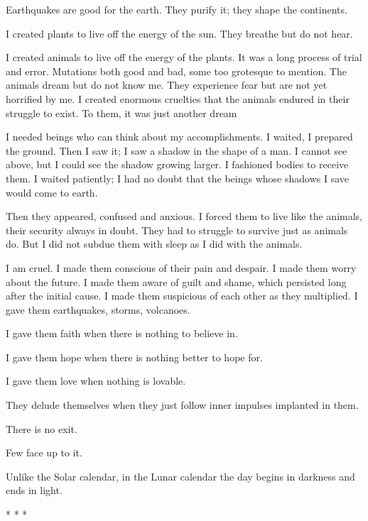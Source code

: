 Earthquakes are good for the earth. They purify it; they shape the continents.

I created plants to live off the energy of the sun. They breathe but do not hear.

I created animals to live off the energy of the plants. It was a long process of trial and error. Mutations both good and bad, some too grotesque to mention. The animals dream but do not know me. They experience fear but are not yet horrified by me. I created enormous cruelties that the animals endured in their struggle to exist. To them, it was just another dream

I needed beings who can think about my accomplishments. I waited, I prepared the ground. Then I saw it; I saw a shadow in the shape of a man. I cannot see above, but I could see the shadow growing larger. I fashioned bodies to receive them. I waited patiently; I had no doubt that the beings whose shadows I save would come to earth.

Then they appeared, confused and anxious. I forced them to live like the animals, their security always in doubt. They had to struggle to survive just as animals do. But I did not subdue them with sleep as I did with the animals.

I am cruel. I made them conscious of their pain and despair. I made them worry about the future. I made them aware of guilt and shame, which persisted long after the initial cause. I made them suspicious of each other as they multiplied. I gave them earthquakes, storms, volcanoes.

I gave them faith when there is nothing to believe in.

I gave them hope when there is nothing better to hope for.

I gave them love when nothing is lovable.

They delude themselves when they just follow inner impulses implanted in them.

There is no exit.

Few face up to it.

Unlike the Solar calendar, in the Lunar calendar the day begins in darkness and ends in light.



\begin{center}* * *\end{center}

